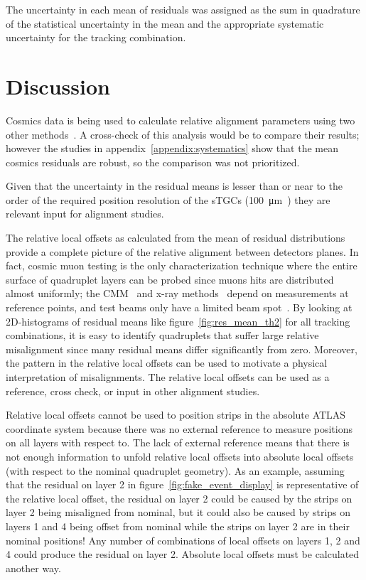 The uncertainty in each mean of residuals was assigned as the sum in quadrature of the statistical uncertainty in the mean and the appropriate systematic uncertainty for the tracking combination. 

\section{Discussion}

Cosmics data is being used to calculate relative alignment parameters using two other methods~\cite{lefebvre_thesis}. A cross-check of this analysis would be to compare their results; however the studies in appendix~\ref{appendix:systematics} show that the mean cosmics residuals are robust, so the comparison was not prioritized.

Given that the uncertainty in the residual means is lesser than or near to the order of the required position resolution of the sTGCs (\SI{100}{\micro\meter}~\cite{nsw_tdr}) they are relevant input for alignment studies.

The relative local offsets as calculated from the mean of residual distributions provide a complete picture of the relative alignment between detectors planes. In fact, cosmic muon testing is the only characterization technique where the entire surface of quadruplet layers can be probed since muons hits are distributed almost uniformly; the CMM~\cite{carlson_results_2019} and x-ray methods~\cite{lefebvre_precision_2020} depend on measurements at reference points, and test beams only have a limited beam spot~\cite{abusleme_performance_2016}. By looking at 2D-histograms of residual means like figure~\ref{fig:res_mean_th2} for all tracking combinations, it is easy to identify quadruplets that suffer large relative misalignment since many residual means differ significantly from zero. Moreover, the pattern in the relative local offsets can be used to motivate a physical interpretation of misalignments. The relative local offsets can be used as a reference, cross check, or input in other alignment studies.

Relative local offsets cannot be used to position strips in the absolute ATLAS coordinate system because there was no external reference to measure positions on all layers with respect to. The lack of external reference means that there is not enough information to unfold relative local offsets into absolute local offsets (with respect to the nominal quadruplet geometry). As an example, assuming that the residual on layer 2 in figure~\ref{fig:fake_event_display} is representative of the relative local offset, the residual on layer 2 could be caused by the strips on layer 2 being misaligned from nominal, but it could also be caused by strips on layers 1 and 4 being offset from nominal while the strips on layer 2 are in their nominal positions! Any number of combinations of local offsets on layers 1, 2 and 4 could produce the residual on layer 2. Absolute local offsets must be calculated another way.